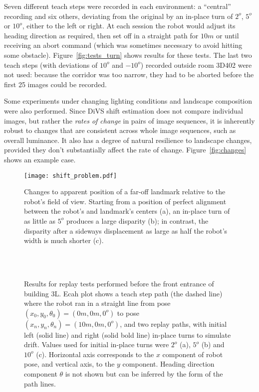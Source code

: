 \documentclass[twocolumn, 9pt,fleqn]{jsproceedings}
\begin{document}
Seven different teach steps were recorded in each environment: a ``central'' recording and six others, deviating from the original by an in-place turn of $2^o$, $5^o$ or $10^o$, either to the left or right. At each session the robot would adjust its heading direction as required, then set off in a straight path for $10m$ or until receiving an abort command (which was sometimes necessary to avoid hitting some obstacle). Figure~\ref{fig:tests_turn} shows results for these tests. The last two teach steps (with deviations of $10^o$ and $-10^o$) recorded outside room 3D402 were not used: because the corridor was too narrow, they had to be aborted before the first 25 images could be recorded.

Some experiments under changing lighting conditions and landscape composition were also performed. Since DiVS shift estimation does not compare individual images, but rather the {\it rates of change} in pairs of image sequences, it is inherently robust to changes that are consistent across whole image sequences, such as overall luminance. It also has a degree of natural resilience to landscape changes, provided they don't substantially affect the rate of change. Figure~\ref{fig:changes} shows an example case.

\begin{figure}[h!]
\texttt{[image: shift\_problem.pdf]}
\caption{Changes to apparent position of a far-off landmark relative to the robot's field of view. Starting from a position of perfect alignment between the robot's and landmark's centers (a), an in-place turn of as little as $5^o$ produces a large disparity (b); in contrast, the disparity after a sideways displacement as large as half the robot's width is much shorter (c).}
\label{fig:shift_problem}
\end{figure}

\begin{figure}[h!]
\centering
{}\\
\\
\caption{Results for replay tests performed before the front entrance of building 3L. Ecah plot shows a teach step path (the dashed line) where the robot ran in a straight line from pose $(x_0, y_0, \theta_0) = (0m, 0m, 0^o)$ to pose $(x_n, y_n, \theta_n) = (10m, 0m, 0^o)$, and two replay paths, with initial left (solid line) and right (solid bold line) in-place turns to simulate drift. Values used for initial in-place turns were $2^o$ (a),  $5^o$ (b) and $10^o$ (c). Horizontal axis corresponds to the $x$ component of robot pose, and vertical axis, to the $y$ component. Heading direction component $\theta$ is not shown but can be inferred by the form of the path lines.}
\label{fig:replay_tests}
\end{figure}
\end{document}
